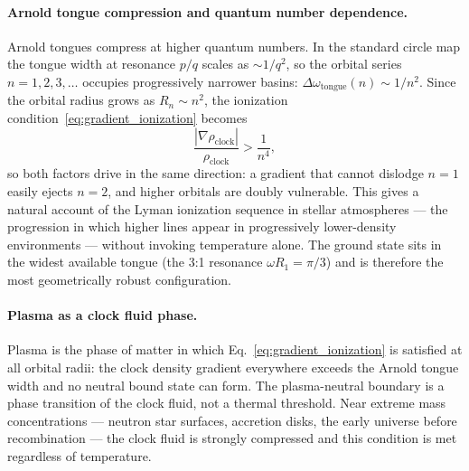 \paragraph{Arnold tongue compression and quantum number dependence.}
Arnold tongues compress at higher quantum numbers.
In the standard circle map the tongue width at resonance $p/q$ scales
as $\sim 1/q^2$, so the orbital series $n=1,2,3,\ldots$ occupies
progressively narrower basins:
$\Delta\omega_\text{tongue}(n)\sim 1/n^2$.
Since the orbital radius grows as $R_n\sim n^2$, the ionization
condition~\eqref{eq:gradient_ionization} becomes
\begin{equation}
    \frac{|\nabla\rho_\text{clock}|}{\rho_\text{clock}}
        > \frac{1}{n^4},
    \label{eq:tongue_compression}
\end{equation}
so both factors drive in the same direction: a gradient that cannot
dislodge $n=1$ easily ejects $n=2$, and higher orbitals are doubly
vulnerable.
This gives a natural account of the Lyman ionization sequence in stellar
atmospheres --- the progression in which higher lines appear in
progressively lower-density environments --- without invoking temperature
alone.
The ground state sits in the widest available tongue (the 3:1 resonance
$\omega R_1 = \pi/3$) and is therefore the most geometrically robust
configuration.

\paragraph{Plasma as a clock fluid phase.}
Plasma is the phase of matter in which
Eq.~\eqref{eq:gradient_ionization} is satisfied at all orbital radii:
the clock density gradient everywhere exceeds the Arnold tongue width
and no neutral bound state can form.
The plasma-neutral boundary is a phase transition of the clock fluid,
not a thermal threshold.
Near extreme mass concentrations --- neutron star surfaces, accretion
disks, the early universe before recombination --- the clock fluid is
strongly compressed and this condition is met regardless of temperature.

